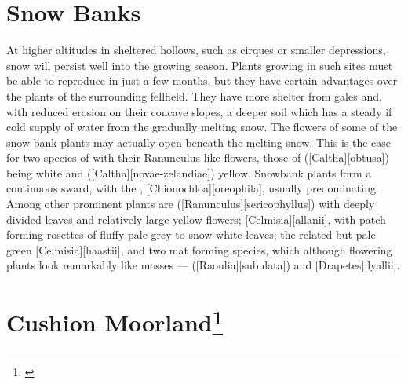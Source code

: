 \section{Snow Banks}

At higher altitudes in sheltered hollows, such as cirques or smaller depressions, snow will persist well into the growing season.
Plants growing in such sites must be able to reproduce in just a few months, but they have certain advantages over the plants of the surrounding fellfield.
They have more shelter from gales and, with reduced erosion on their concave slopes, a deeper soil which has a steady if cold supply of water from the gradually melting snow.
The flowers of some of the snow bank plants may actually open beneath the melting snow.
This is the case for two species of  with their Ranunculus-like flowers, those of  ([Caltha][obtusa]) being white and  ([Caltha][novae-zelandiae]) yellow.
Snowbank plants form a continuous sward, with the , [Chionochloa][oreophila], usually predominating.
Among other prominent plants are  ([Ranunculus][sericophyllus]) with deeply divided leaves and relatively large yellow flowers; [Celmisia][allanii], with patch forming rosettes of fluffy pale grey to snow white leaves; the related but pale green [Celmisia][haastii], and two mat forming species, which although flowering plants look remarkably like mosses ---  ([Raoulia][subulata]) and [Drapetes][lyallii].

\section[Cushion Moorland]{Cushion Moorland\thinspace\footnote{\cite{mark1970high}}}

